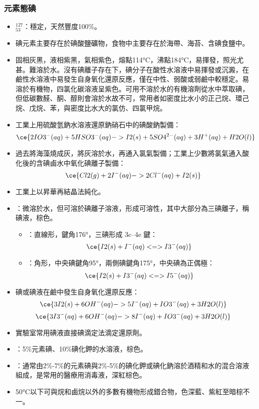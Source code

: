 \documentclass[a4paper,12pt]{report}
\begin{document}
\subsubsection{元素態碘}
\begin{itemize}
\item $^{127}_{53}$\rmI：穩定，天然豐度100\%。
\item 碘元素主要存在於碘酸鹽礦物，食物中主要存在於海帶、海苔、含碘食鹽中。
\item 固相灰黑，液相紫黑，氣相紫色，熔點114°C，沸點184°C，易揮發，照光尤甚。難溶於水。沒有碘離子存在下，碘分子在酸性水溶液中易揮發或沉澱，在鹼性水溶液中易發生自身氧化還原反應，僅在中性、弱酸或弱鹼中較穩定。易溶於有機物，四氯化碳溶液呈紫色。可用不溶於水的有機溶劑從水中萃取碘，但低碳數醛、酮、醇則會溶於水故不可，常用者如密度比水小的正己烷、環己烷、戊烷、苯，與密度比水大的氯仿、四氯甲烷。
\item 工業上用硫酸氫鈉水溶液還原鈉硝石中的碘酸鈉製備：
\[\ce{2IO3^-(aq) + 5HSO3^-(aq) -> I2(s) + 5SO4^{2-}(aq) + 3H^+(aq) + H2O(l)}\]
\item 過去將海藻燒成灰，將灰溶於水，再通入氯氣製備；工業上少數將氯氣通入酸化後的含碘鹵水中氧化碘離子製備：
\[\ce{Cl2(g) + 2I^-(aq) -> 2Cl^-(aq) + I2(s)}\]
\item 工業上以昇華再結晶法純化。
\item {}：微溶於水，但可溶於碘離子溶液，形成可溶性，其中大部分為三碘離子，稱碘液，棕色。
\begin{itemize}
\item {}：直線形，鍵角176°，三碘形成 3c–4e 鍵：
\[\ce{I2(s) + I^-(aq) <=> I3^-(aq)}\]
\item {}：角形，中央碘鍵角95°，兩側碘鍵角175°，中央碘為正偶極：
\[\ce{I2(s) + I3^-(aq) <=> I5^-(aq)}\]
\end{itemize}
\item 碘或碘液在鹼中發生自身氧化還原反應：
\[\ce{3I2(s) + 6OH^-(aq) -> 5I^-(aq) + IO3^-(aq) + 3H2O(l)}\]
\[\ce{3I3^-(aq) + 6OH^-(aq) -> 8I^-(aq) + IO3^-(aq) + 3H2O(l)}\]
\item 實驗室常用碘液直接碘滴定法滴定還原劑。
\item {}：5\%元素碘、10\%碘化鉀的水溶液，棕色。
\item {}：通常由2\%-7\%的元素碘與2\%-5\%的碘化鉀或碘化鈉溶於酒精和水的混合溶液組成，是常用的醫療用消毒液，深紅棕色。
\item 50°C以下可與烷和鹵烷以外的多數有機物形成錯合物，色深藍、紫紅至暗棕不一。
\end{itemize}
\end{document}
